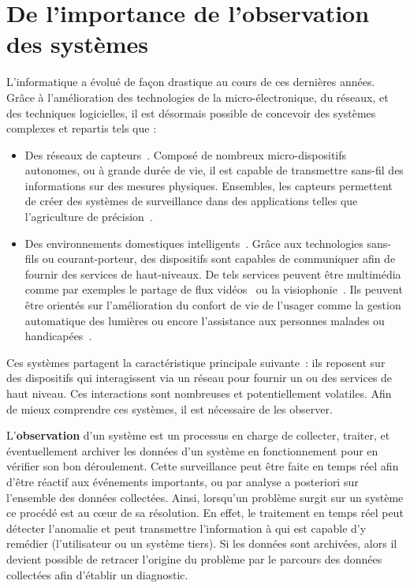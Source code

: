 \section{De l'importance de l'observation des systèmes}\label{sec:intro:contexte}
L'informatique a évolué de façon drastique au cours de ces dernières années. Grâce à l'amélioration des technologies de la micro-électronique, du réseaux, et des techniques logicielles, il est désormais possible de concevoir des systèmes complexes et repartis tels que :
\begin{itemize}
 \item Des réseaux de capteurs~\cite{Akyildiz:wsn,Szewczyk:monitoring}. Composé de nombreux micro-dispositifs autonomes, ou à grande durée de vie, il est capable de transmettre sans-fil des informations sur des mesures physiques. Ensembles, les capteurs permettent de créer des systèmes de surveillance dans des applications telles que l'agriculture de précision~\cite{Jurdak:sumac}.
 \item Des environnements domestiques intelligents~\cite{Harper:smarthome, Chan:smarthome, Coyle:assisted}. Grâce aux technologies sans-fils ou courant-porteur, des dispositifs sont capables de communiquer afin de fournir des services de haut-niveaux. De tels services peuvent être multimédia comme par exemples le partage de flux vidéos~\cite{Kang:upnpav} ou la visiophonie~\cite{Vilei:videophone}. Ils peuvent être orientés sur l'amélioration du confort de vie de l'usager comme la gestion automatique des lumières ou encore l'assistance aux personnes malades ou handicapées~\cite{Korhonen:health}.
\end{itemize}

Ces systèmes partagent la caractéristique principale suivante~: ils reposent sur des dispositifs qui interagissent via un réseau pour fournir un ou des services de haut niveau. Ces interactions sont nombreuses et potentiellement volatiles. Afin de mieux comprendre ces systèmes, il est nécessaire de les observer.

L'\textbf{observation} d'un système est un processus en charge de collecter, traiter, et éventuellement archiver les données d'un système en fonctionnement pour en vérifier son bon déroulement. Cette surveillance peut être faite en temps réel afin d'être réactif aux événements importants, ou par analyse a posteriori sur l'ensemble des données collectées. Ainsi, lorsqu'un problème surgit sur un système ce procédé est au cœur de sa résolution. En effet, le traitement en temps réel peut détecter l'anomalie et peut transmettre l'information à qui est capable d'y remédier (l'utilisateur ou un système tiers). Si les données sont archivées, alors il devient possible de retracer l'origine du problème par le parcours des données collectées afin d'établir un diagnostic.

